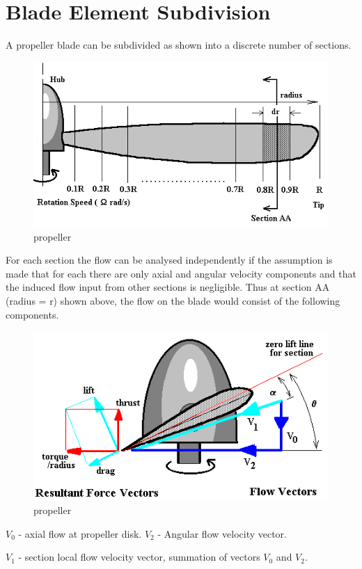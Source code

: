 \section{Blade Element Subdivision}
A propeller blade can be subdivided as shown into a discrete number of sections.
\begin{figure}[h]
\centering
\includegraphics[scale=.7]{blade1.jpeg}
\caption{propeller}
\label{figure}
\end{figure}
For each section the flow can be analysed independently if the assumption is made that for each there are only axial and angular velocity components and that the induced flow input from other sections is negligible. Thus at section AA (radius = r) shown above, the flow on the blade would consist of the following components.
\begin{figure}[h]
	\centering
	\includegraphics[scale=.8]{blade2}
	\caption{propeller}
	\label{figure}
\end{figure}

$V_{0}$ - axial flow at propeller disk.
$V_{2}$ - Angular flow velocity vector.

$V_{1}$ - section local flow velocity vector, summation of vectors $V_{0}$ and $V_{2}$.


